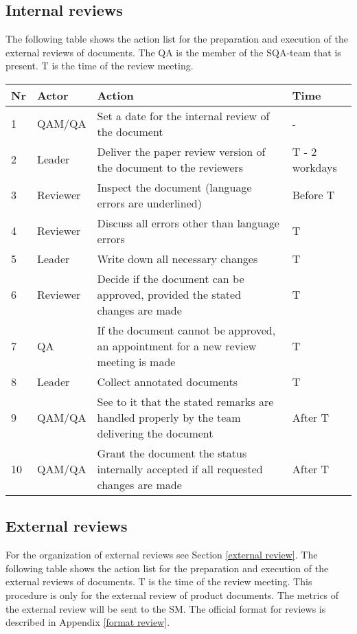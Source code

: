 \subsection{Internal reviews} \label{internal review details}
The following table shows the action list for
    the preparation and execution of the external reviews of documents. The QA is the member of the SQA-team that is present. T is the time of the review meeting.


\begin{tabular}{|l|l|p{20em}|l|}
\hline
 Nr &Actor     &  Action                                                 & Time \\
\hline
 1  & QAM/QA   & Set a date for the internal review of the document      &    -\\
 2  & Leader   &  Deliver the paper review version of the document to the reviewers   & T - 2 workdays\\
                
 3  & Reviewer &  Inspect the document (language errors are underlined)  & Before T\\
 4  & Reviewer &  Discuss all errors other than language errors          & T\\
 5  & Leader   &  Write down all necessary changes                       & T\\
 6  & Reviewer &  Decide if the document can be approved, provided the stated changes are made  & T\\
                
 7  & QA       &  If the document cannot be approved, an appointment for a new review meeting is made    & T\\
                
 8  & Leader   &  Collect annotated documents                            & T\\
 9  & QAM/QA   & See to it that the stated remarks are handled properly by the team delivering the document  &   After T\\
                
 10 & QAM/QA   & Grant the document the status internally accepted if all requested changes are made     &   After T\\
                
\hline
\end{tabular}

\subsection{External reviews} \label{external review details}
    For the organization of external reviews see Section \ref{external review}. The following table shows the action list for
    the preparation and execution of the external reviews of documents. T is the time of the review
    meeting. This procedure is only for the external review of product documents. The metrics of
    the external review will be sent to the SM. The official format for reviews is described in Appendix \ref{format review}.

